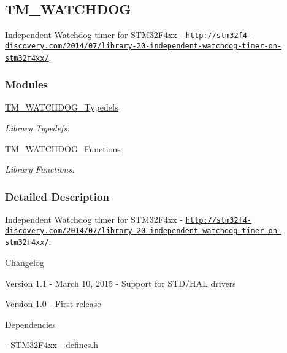 \hypertarget{group___t_m___w_a_t_c_h_d_o_g}{}\subsection{T\+M\+\_\+\+W\+A\+T\+C\+H\+D\+O\+G}
\label{group___t_m___w_a_t_c_h_d_o_g}


Independent Watchdog timer for S\+T\+M32\+F4xx -\/ \href{http://stm32f4-discovery.com/2014/07/library-20-independent-watchdog-timer-on-stm32f4xx/}{\tt http\+://stm32f4-\/discovery.\+com/2014/07/library-\/20-\/independent-\/watchdog-\/timer-\/on-\/stm32f4xx/}.  


\subsubsection*{Modules}
\begin{DoxyCompactItemize}
\item 
\hyperlink{group___t_m___w_a_t_c_h_d_o_g___typedefs}{T\+M\+\_\+\+W\+A\+T\+C\+H\+D\+O\+G\+\_\+\+Typedefs}
\begin{DoxyCompactList}\small\item\em Library Typedefs. \end{DoxyCompactList}\item 
\hyperlink{group___t_m___w_a_t_c_h_d_o_g___functions}{T\+M\+\_\+\+W\+A\+T\+C\+H\+D\+O\+G\+\_\+\+Functions}
\begin{DoxyCompactList}\small\item\em Library Functions. \end{DoxyCompactList}\end{DoxyCompactItemize}


\subsubsection{Detailed Description}
Independent Watchdog timer for S\+T\+M32\+F4xx -\/ \href{http://stm32f4-discovery.com/2014/07/library-20-independent-watchdog-timer-on-stm32f4xx/}{\tt http\+://stm32f4-\/discovery.\+com/2014/07/library-\/20-\/independent-\/watchdog-\/timer-\/on-\/stm32f4xx/}. 

\begin{DoxyParagraph}{Changelog}

\end{DoxyParagraph}
\begin{DoxyVerb} Version 1.1
  - March 10, 2015
  - Support for STD/HAL drivers

 Version 1.0
  - First release
\end{DoxyVerb}


\begin{DoxyParagraph}{Dependencies}

\end{DoxyParagraph}
\begin{DoxyVerb} - STM32F4xx
 - defines.h
\end{DoxyVerb}
 